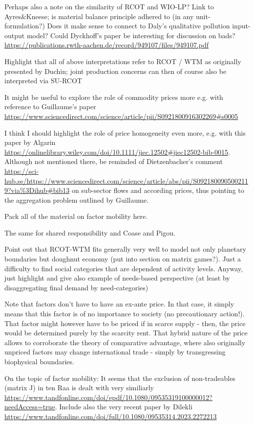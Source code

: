 \documentclass{article}
\begin{document}
\begin{refsection}
Perhaps also a note on the similarity of RCOT and WIO-LP?
Link to Ayres\&Kneese; is material balance principle adhered to (in any unit-formulation?)
Does it make sense to connect to Daly's qualitative pollution input-output model?
Could Dyckhoff's paper be interesting for discussion on bads? \url{https://publications.rwth-aachen.de/record/949107/files/949107.pdf}

Highlight that all of above interpretations refer to RCOT / WTM as originally presented by Duchin; joint production concerns can then of course also be interpreted via SU-RCOT

It might be useful to explore the role of commodity prices more e.g. with reference to Guillaume's paper \url{https://www.sciencedirect.com/science/article/pii/S0921800916302269#s0005}

I think I should highlight the role of price homogeneity even more, e.g. with this paper by Algarin \url{https://onlinelibrary.wiley.com/doi/10.1111/jiec.12502#jiec12502-bib-0015}. Although not mentioned there, be reminded of Dietzenbacher's comment \url{https://sci-hub.se/https://www.sciencedirect.com/science/article/abs/pii/S0921800905002119?via%3Dihub#bib13} on sub-sector flows and according prices, thus pointing to the aggregation problem outlined by Guillaume.

Pack all of the material on factor mobility here.

The same for shared responsibility and Coase and Pigou.

Point out that RCOT-WTM fits generally very well to model not only planetary boundaries but doughnut economy (put into section on matrix games?). Just a difficulty to find social categories that are dependent of activity levels. Anyway, just highlight and give also example of needs-based perspective (at least by disaggregating final demand by need-categories)

Note that factors don't have to have an ex-ante price. In that case, it simply means that this factor is of no importance to society (no precautionary action!). That factor might however have to be priced if in scarce supply - then, the price would be determined purely by the scarcity rent. That hybrid nature of the price allows to corroborate the theory of comparative advantage, where also originally unpriced factors may change international trade - simply by transgressing biophysical boundaries.

On the topic of factor mobility: It seems that the exclusion of non-tradeables (matrix J) in ten Raa is dealt with very similiarly \url{https://www.tandfonline.com/doi/epdf/10.1080/09535319100000012?needAccess=true}. Include also the very recent paper by Dilekli \url{https://www.tandfonline.com/doi/full/10.1080/09535314.2023.2272213}


\end{refsection}
\end{document}
